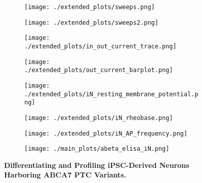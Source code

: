 \begin{figure}[H]
    \begin{subfigure}[t]{0.33\textwidth}
        \caption{}
        \texttt{[image: ./extended\_plots/sweeps.png]}        
    \end{subfigure}   
    \begin{subfigure}[t]{0.2\textwidth}
        \caption{}
        \texttt{[image: ./extended\_plots/sweeps2.png]}        
    \end{subfigure}   
    \begin{subfigure}[t]{0.33\textwidth}
        \caption{}
        \texttt{[image: ./extended\_plots/in\_out\_current\_trace.png]}        
    \end{subfigure}  
    \begin{subfigure}[t]{0.33\textwidth}
        \caption{}
        \texttt{[image: ./extended\_plots/out\_current\_barplot.png]}        
    \end{subfigure}  
    \begin{subfigure}[t]{0.25\textwidth}
        \caption{}
        \texttt{[image: ./extended\_plots/iN\_resting\_membrane\_potential.png]}        
    \end{subfigure}  
    \begin{subfigure}[t]{0.25\textwidth}
        \caption{}
        \texttt{[image: ./extended\_plots/iN\_rheobase.png]}        
    \end{subfigure} 
    \hspace{1cm}
    \begin{subfigure}[t]{0.4\textwidth}
        \caption{}
        \texttt{[image: ./extended\_plots/iN\_AP\_frequency.png]}        
    \end{subfigure}  
    \hspace{1cm}
    \begin{subfigure}[t]{0.6\textwidth}
        \caption{}
        \texttt{[image: ./main\_plots/abeta\_elisa\_iN.png]}        
    \end{subfigure}  
    \caption{
        \textbf{Differentiating and Profiling iPSC-Derived Neurons Harboring ABCA7 PTC Variants.}\\
    }
    \label{fig:differentiating_iPSC_neurons}
\end{figure}
